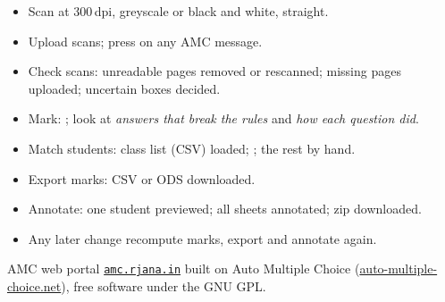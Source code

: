\documentclass[11pt]{article}
\newcommand\portal{\href{https://amc.rjana.in}{\texttt{amc.rjana.in}}}
\begin{document}
\begin{panel}[colframe=after,boxrule=1pt,title={\bfseries After the exam},colbacktitle=after,coltitle=white]
\begin{itemize}[label=\cb]
  \item Scan at 300\,dpi, greyscale or black and white, straight.
  \item Upload scans; press  on any AMC message.
  \item Check scans: unreadable pages removed or rescanned; missing pages uploaded; uncertain boxes decided.
  \item Mark: ; look at \emph{answers that break the rules} and \emph{how each question did}.
  \item Match students: class list (CSV) loaded; ; the rest by hand.
  \item Export marks: CSV or ODS downloaded.
  \item Annotate: one student previewed; all sheets annotated; zip downloaded.
  \item Any later change \textrightarrow{} recompute marks, export and annotate again.
\end{itemize}
\end{panel}

\vfill
\begin{center}\small\color{muted}
AMC web portal \textbullet{} \portal{} \textbullet{} built on Auto Multiple Choice (\href{https://www.auto-multiple-choice.net}{auto-multiple-choice.net}), free software under the GNU GPL.
\end{center}
\end{document}
